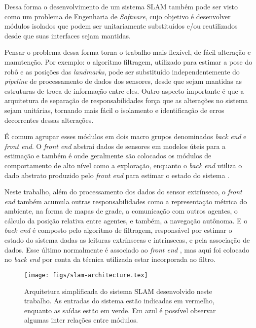 Dessa forma o desenvolvimento de 
um sistema SLAM também pode ser visto como um problema de Engenharia de
\textit{Software}, cujo objetivo é desenvolver módulos isolados que podem 
ser unitariamente substituídos e/ou reutilizados desde que suas interfaces 
sejam mantidas.

Pensar o problema dessa forma torna o trabalho mais flexível, de fácil alteração e manutenção. 
Por exemplo: o algoritmo filtragem, utilizado para estimar a pose do robô e as 
posições das \textit{landmarks}, pode ser substituído independentemente do 
\textit{pipeline} de processamento de dados dos sensores, desde que sejam 
mantidas as estruturas de troca de informação entre eles. 
Outro aspecto importante é que a arquitetura de separação de 
responsabilidades força que as alterações no sistema sejam unitárias, 
tornando mais fácil o isolamento e identificação de erros decorrentes 
dessas alterações.

É comum agrupar esses módulos em dois macro grupos denominados 
\textit{back end} e \textit{front end}. O \textit{front end} abstrai dados de 
sensores em modelos úteis para a estimação e também é onde geralmente são colocados os módulos de comportamento de alto nível como a exploração, enquanto o \textit{back end} utiliza 
o dado abstrato produzido pelo \textit{front end} para estimar o estado do 
sistema \cite{cadena2016past}.

Neste trabalho, além do processamento dos dados do sensor extrínseco, o 
\textit{front end} também acumula outras responsabilidades como a representação 
métrica do ambiente, na forma de mapas de grade, a comunicação com outros 
agentes, o cálculo da posição relativa entre agentes, e também, a navegação 
autônoma. E o \textit{back end} é composto pelo algoritmo de filtragem, 
responsável por estimar o estado do sistema dadas as leituras extrínsecas e intrínsecas, e pela associação de dados. Esse último normalmente é 
associado ao \textit{front end} \cite[]{cadena2016past}, mas aqui foi 
colocado no \textit{back end} por conta da técnica utilizada estar 
incorporada ao filtro.

\begin{figure}[h]
  \centering
  \texttt{[image: figs/slam-architecture.tex]}
  \caption{Arquitetura simplificada do sistema SLAM desenvolvido neste trabalho. As entradas do sistema estão indicadas em vermelho, enquanto as saídas estão em verde. Em azul é 
  possível observar algumas inter relações entre módulos.}
  \label{fig:slam-architecture}
\end{figure}


